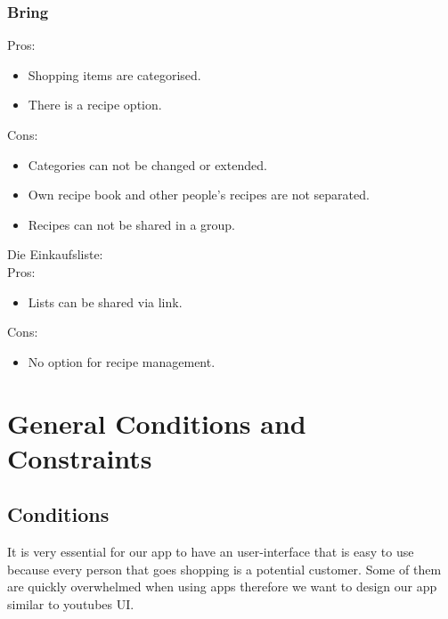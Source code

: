 \documentclass[12pt]{article}
\theoremstyle{definition}
\begin{document}
\subsubsection{Bring}
Pros:
\begin{itemize}
\item Shopping items are categorised.
\item There is a recipe option.\\
\end{itemize}
Cons:
\begin{itemize}
\item Categories can not be changed or extended.
\item Own recipe book and other people's recipes are not separated.
\item Recipes can not be shared in a group.
\end{itemize}
Die Einkaufsliste:\\
Pros:
\begin{itemize}
\item Lists can be shared via link.
\end{itemize}
Cons:
\begin{itemize}
\item No option for recipe management.
\end{itemize}

\pagebreak

\section{General Conditions and Constraints}

\subsection{Conditions}
It is very essential for our app to have an user-interface that is easy to use because every person that goes shopping is a potential customer. Some of them are quickly overwhelmed when using apps therefore we want to design our app similar to youtubes UI.
\end{document}
